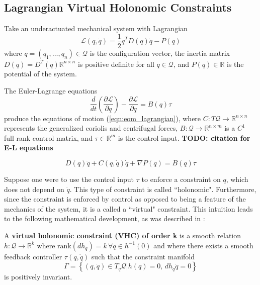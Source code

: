 \subsection{Lagrangian Virtual Holonomic Constraints}
Take an underactuated mechanical system with Lagrangian
\begin{equation}\label{eqn:lagrangian}
\mathcal{L}(q,\dot{q}) = \frac{1}{2} \dot{q}^T D(q) \dot{q} - P(q)
\end{equation}
where \(q = (q_1,\ldots,q_n) \in \mathcal{Q}\) is the configuration vector, 
the inertia matrix \(D(q) = D^T(q) \mathbb{R}^{n \times n}\) 
is positive definite for all 
\(q \in \mathcal{Q}\), and \(P(q) \in \mathbb{R}\) is the potential of the
system.

The Euler-Lagrange equations 
\begin{equation}\label{eqn:el_eqns}
   \frac{d}{dt} \left( \frac{\partial \mathcal{L}}{\partial \dot{q}}\right) -
   \frac{\partial \mathcal{L}}{\partial q} = B(q)\tau
\end{equation}
produce the equations of motion (\ref{eqn:eom_lagrangian}), where
\(C : T\mathcal{Q} \rightarrow \mathbb{R}^{n \times n}\) represents the
generalized coriolis and centrifugal forces,
\(B : \mathcal{Q} \rightarrow \mathbb{R}^{n \times m}\) is a 
\(C^1\) full rank control matrix, and \(\tau \in \mathbb{R}^{m}\) is the control 
input. \textbf{TODO: citation for E-L equations}

\begin{equation}\label{eqn:eom_lagrangian}
D(q)\ddot{q} + C(q,\dot{q})\dot{q} + \nabla P(q) = B(q)\tau
\end{equation}

Suppose one were to use the control input \(\tau\) to enforce a
constraint on \(q\), which does not depend on \(\dot{q}\). This type of
constraint is called ``holonomic". Furthermore, since the constraint is enforced
by control as opposed to being a feature of the mechanics of the system, it is a
called a ``virtual" constraint.  This intuition leads to the following
mathematical development, as was described in \cite{vhcs_for_el_systems}:

\begin{defn}\label{defn:vhc_order_k}
   A \textbf{virtual holonomic constraint (VHC) of order k} is a smooth relation 
   \( h : \mathcal{Q} \rightarrow \mathbb{R}^k\) where
   \( \text{rank}(dh_q) = k \, \forall q \in h^{-1}(0)\) and where there exists
   a smooth feedback controller \(\tau(q,\dot{q})\) such that the constraint
   manifold
   \[
      \Gamma = \left\{ (q,\dot{q}) \in T_q\mathcal{Q} \vert h(q) = 0, \, 
      dh_q \dot{q} = 0\right\}
   \]
   is positively invariant.
\end{defn}

